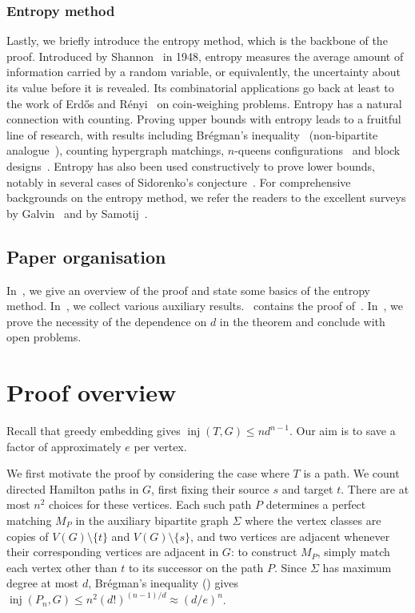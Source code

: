 \documentclass[reqno,final,a4paper]{amsart}
\numberwithin{equation}{section}
\theoremstyle{definition}
\theoremstyle{remark}
\DeclareMathOperator{\inj}{inj}
\begin{document}
\subsubsection{Entropy method}
Lastly, we briefly introduce the entropy method, which is the backbone of the proof.
Introduced by Shannon~\cite{Shannon1948} in 1948, entropy measures the average amount of information carried by a random variable, or equivalently, the uncertainty about its value before it is revealed. Its combinatorial applications go back at least to the work of Erd\H{o}s and R\'enyi~\cite{ErdosRenyi1963} on coin-weighing problems. 
Entropy has a natural connection with counting. Proving upper bounds with entropy leads to a fruitful line of research, with results including 
Br\'egman's inequality~\cite{Radhakrishnan1997} (non-bipartite analogue~\cite{cutler2011entropy}), counting hypergraph matchings, $n$-queens configurations~\cite{Luria-n-queens, Simkin-n-queen} and block designs~\cite{Linial-Luria-STS,keevash2018counting}. Entropy has also been used constructively to prove lower bounds, notably in several cases of Sidorenko's conjecture~\cite{szegedy14}.
For comprehensive backgrounds on the entropy method, we refer the readers to the excellent surveys by Galvin~\cite{GalvinEntropy} and by  Samotij~\cite{SamotijEntropy}.


\subsection{Paper organisation}
In~, we give an overview of the proof and state some basics of the entropy method. In~, we collect various auxiliary results.~ contains the proof of~. In~, we prove the necessity of the dependence on $d$ in the theorem and conclude with open problems.


\section{Proof overview}\label{sec:overview}
Recall that greedy embedding gives $\inj(T,G)\le nd^{n-1}$.
Our aim is to save a factor of approximately $e$ per vertex.

We first motivate the proof by considering the case where $T$ is a path. We count directed Hamilton paths in $G$, first fixing their source $s$ and target $t$. There are at most $n^2$ choices for these vertices. Each such path $P$ determines a perfect matching $M_P$ in the auxiliary bipartite graph $\Sigma$ where the vertex classes are copies of $V(G)\setminus\{t\}$ and $V(G)\setminus\{s\}$, and two vertices are adjacent whenever their corresponding vertices are adjacent in $G$: to construct $M_P$, simply match each vertex other than $t$ to its successor on the path $P$. Since $\Sigma$ has maximum
degree at most $d$, Br\'egman's inequality () gives $\inj(P_n,G)\leq n^2(d!)^{(n-1)/d}\approx (d/e)^n$.
\end{document}
